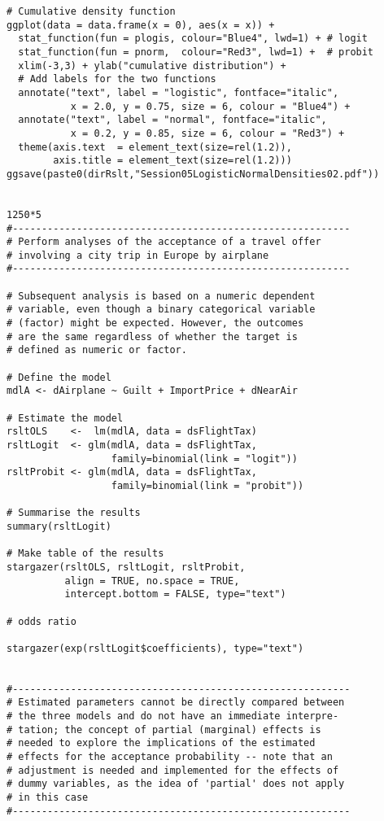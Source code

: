 \documentclass{article}
\begin{document}
\begin{tiny}
\begin{verbatim}
# Cumulative density function
ggplot(data = data.frame(x = 0), aes(x = x)) +
  stat_function(fun = plogis, colour="Blue4", lwd=1) + # logit
  stat_function(fun = pnorm,  colour="Red3", lwd=1) +  # probit
  xlim(-3,3) + ylab("cumulative distribution") +
  # Add labels for the two functions
  annotate("text", label = "logistic", fontface="italic", 
           x = 2.0, y = 0.75, size = 6, colour = "Blue4") +
  annotate("text", label = "normal", fontface="italic", 
           x = 0.2, y = 0.85, size = 6, colour = "Red3") +
  theme(axis.text  = element_text(size=rel(1.2)),
        axis.title = element_text(size=rel(1.2)))
ggsave(paste0(dirRslt,"Session05LogisticNormalDensities02.pdf"))  


1250*5
#----------------------------------------------------------
# Perform analyses of the acceptance of a travel offer 
# involving a city trip in Europe by airplane
#----------------------------------------------------------

# Subsequent analysis is based on a numeric dependent
# variable, even though a binary categorical variable 
# (factor) might be expected. However, the outcomes
# are the same regardless of whether the target is
# defined as numeric or factor.

# Define the model
mdlA <- dAirplane ~ Guilt + ImportPrice + dNearAir

# Estimate the model
rsltOLS    <-  lm(mdlA, data = dsFlightTax)
rsltLogit  <- glm(mdlA, data = dsFlightTax, 
                  family=binomial(link = "logit"))
rsltProbit <- glm(mdlA, data = dsFlightTax, 
                  family=binomial(link = "probit"))

# Summarise the results
summary(rsltLogit)

# Make table of the results
stargazer(rsltOLS, rsltLogit, rsltProbit,
          align = TRUE, no.space = TRUE, 
          intercept.bottom = FALSE, type="text")

# odds ratio

stargazer(exp(rsltLogit$coefficients), type="text")


#----------------------------------------------------------
# Estimated parameters cannot be directly compared between 
# the three models and do not have an immediate interpre-
# tation; the concept of partial (marginal) effects is 
# needed to explore the implications of the estimated 
# effects for the acceptance probability -- note that an 
# adjustment is needed and implemented for the effects of 
# dummy variables, as the idea of 'partial' does not apply 
# in this case 
#----------------------------------------------------------



\end{verbatim}
\end{tiny}
\end{document}
